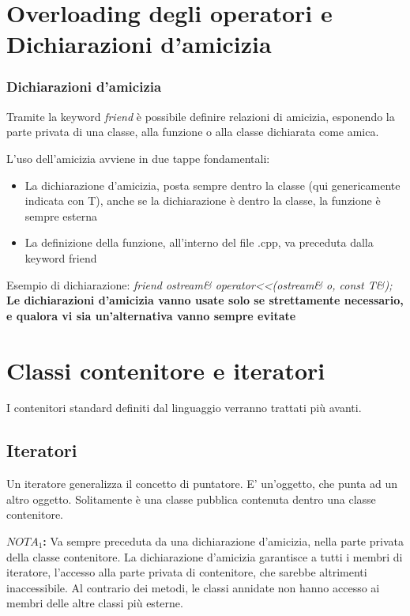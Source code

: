 \section{Overloading degli operatori e Dichiarazioni d'amicizia} 

\subsubsection{Dichiarazioni d'amicizia}

Tramite la keyword \textit{friend} è possibile definire relazioni di amicizia, esponendo la parte privata di una classe, alla funzione o alla classe dichiarata come amica.

L'uso dell'amicizia avviene in due tappe fondamentali:
\begin{itemize}
	\item La dichiarazione d'amicizia, posta sempre dentro la classe (qui genericamente indicata con T), anche se la dichiarazione è dentro la classe, la funzione è sempre esterna 
	\item La definizione della funzione, all'interno del file .cpp, va preceduta dalla keyword friend
\end{itemize}

Esempio di dichiarazione: \textit{friend ostream\& operator<<(ostream\& o, const T\&);}\\

\textbf{Le dichiarazioni d'amicizia vanno usate solo se strettamente necessario, e qualora vi sia un'alternativa vanno sempre evitate}

\section{Classi contenitore e iteratori}

I contenitori standard definiti dal linguaggio verranno trattati più avanti.

\subsection{Iteratori}
Un iteratore generalizza il concetto di puntatore. E' un'oggetto, che punta ad un altro oggetto. Solitamente è una classe pubblica contenuta dentro una classe contenitore.

\textbf{$NOTA_{1}$:} Va sempre preceduta da una dichiarazione d'amicizia, nella parte privata della classe contenitore. La dichiarazione d'amicizia garantisce a tutti i membri di iteratore, l'accesso alla parte privata di contenitore, che sarebbe altrimenti inaccessibile. Al contrario dei metodi, le classi annidate non hanno accesso ai membri delle altre classi più esterne.


